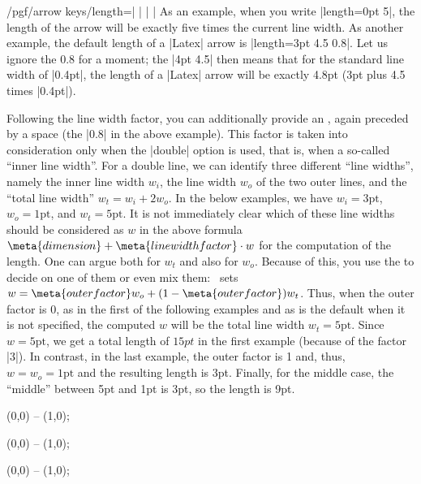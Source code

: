 \begin{key}{/pgf/arrow keys/length=| |%
        | |}
    As an example, when you write |length=0pt 5|, the length of the arrow will
    be exactly five times the current line width. As another example, the
    default length of a |Latex| arrow is |length=3pt 4.5 0.8|. Let us ignore
    the 0.8 for a moment; the |4pt 4.5| then means that for the standard line
    width of |0.4pt|, the length of a |Latex| arrow will be exactly 4.8pt (3pt
    plus 4.5 times |0.4pt|).

    Following the line width factor, you can additionally provide an
    , again preceded by a space (the |0.8| in the above
    example). This factor is taken into consideration only when the |double|
    option is used, that is, when a so-called ``inner line width''. For a
    double line, we can identify three different ``line widths'', namely the
    inner line width $w_i$, the line width  $w_o$ of the two outer lines, and
    the ``total line width'' $w_t = w_i + 2w_o$. In the below examples, we have
    $w_i = 3\mathrm{pt}$, $w_o=1\mathrm{pt}$, and $w_t = 5\mathrm{pt}$. It is
    not immediately clear which of these line widths should be considered as
    $w$ in the above formula $\meta{dimension} + \meta{line width factor}\cdot
    w$ for the computation of the length. One can argue both for $w_t$ and also
    for $w_o$. Because of this, you use the  to decide on
    one of them or even mix them: \tikzname\ sets $w = \meta{outer factor} w_o
    + (1-\meta{outer factor})w_t$. Thus, when the outer factor is $0$, as in
    the first of the following examples and as is the default when it is not
    specified, the computed $w$ will be the total line width $w_t =
    5\mathrm{pt}$. Since $w=5\mathrm{pt}$, we get a total length of $15pt$ in
    the first example (because of the factor |3|). In contrast, in the last
    example, the outer factor is 1 and, thus, $w = w_o = \mathrm{1pt}$ and the
    resulting length is 3pt. Finally, for the middle case, the ``middle''
    between 5pt and 1pt is 3pt, so the length is 9pt.
\begin{codeexample}[preamble={\usetikzlibrary{arrows.meta}}]
\tikz \draw [line width=1pt, double distance=3pt,
             arrows = {-Latex[length=0pt 3 0]}] (0,0) -- (1,0);
\end{codeexample}
\begin{codeexample}[preamble={\usetikzlibrary{arrows.meta}}]
\tikz \draw [line width=1pt, double distance=3pt,
             arrows = {-Latex[length=0pt 3 .5]}] (0,0) -- (1,0);
\end{codeexample}
\begin{codeexample}[preamble={\usetikzlibrary{arrows.meta}}]
\tikz \draw [line width=1pt, double distance=3pt,
             arrows = {-Latex[length=0pt 3 1]} ] (0,0) -- (1,0);
\end{codeexample}


\end{key}

